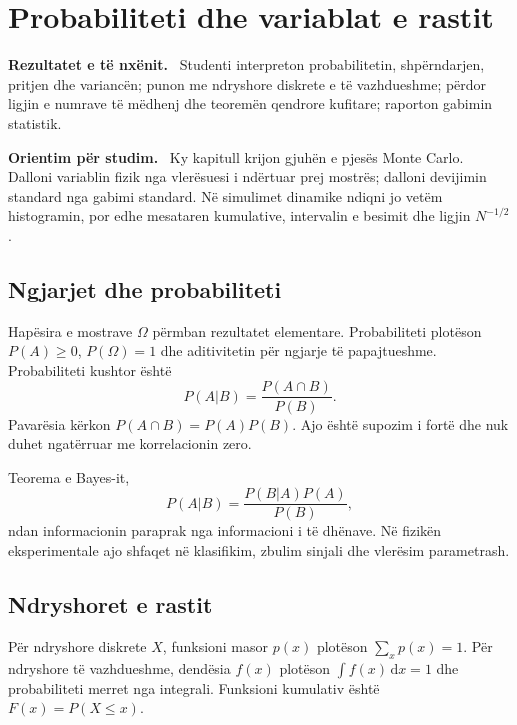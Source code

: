 \documentclass[11pt,oneside,openany]{book}
\newcommand{\dd}{\,\mathrm{d}}
\newenvironment{qellime}{\par\medskip\noindent\textbf{Rezultatet e të nxënit.}\ }{\par\medskip}
\newenvironment{orientim}{\par\medskip\noindent\textbf{Orientim për studim.}\ }{\par\medskip}
\begin{document}




\chapter{Probabiliteti dhe variablat e rastit}
\begin{qellime}
Studenti interpreton probabilitetin, shpërndarjen, pritjen dhe variancën; punon me ndryshore diskrete e të vazhdueshme; përdor ligjin e numrave të mëdhenj dhe teoremën qendrore kufitare; raporton gabimin statistik.
\end{qellime}

\begin{orientim}
Ky kapitull krijon gjuhën e pjesës Monte Carlo. Dalloni variablin fizik nga
vlerësuesi i ndërtuar prej mostrës; dalloni devijimin standard nga gabimi
standard. Në simulimet dinamike ndiqni jo vetëm histogramin, por edhe
mesataren kumulative, intervalin e besimit dhe ligjin $N^{-1/2}$.
\end{orientim}


\section{Ngjarjet dhe probabiliteti}
Hapësira e mostrave $\Omega$ përmban rezultatet elementare. Probabiliteti plotëson $P(A)\ge0$, $P(\Omega)=1$ dhe aditivitetin për ngjarje të papajtueshme. Probabiliteti kushtor është
\begin{equation}
 P(A|B)=\frac{P(A\cap B)}{P(B)}.
\end{equation}
Pavarësia kërkon $P(A\cap B)=P(A)P(B)$. Ajo është supozim i fortë dhe nuk duhet ngatërruar me korrelacionin zero.

Teorema e Bayes-it,
\begin{equation}
 P(A|B)=\frac{P(B|A)P(A)}{P(B)},
\end{equation}
ndan informacionin paraprak nga informacioni i të dhënave. Në fizikën eksperimentale ajo shfaqet në klasifikim, zbulim sinjali dhe vlerësim parametrash.

\section{Ndryshoret e rastit}
Për ndryshore diskrete $X$, funksioni masor $p(x)$ plotëson $\sum_xp(x)=1$. Për ndryshore të vazhdueshme, dendësia $f(x)$ plotëson $\int f(x)\dd x=1$ dhe probabiliteti merret nga integrali. Funksioni kumulativ është $F(x)=P(X\le x)$.
\end{document}
